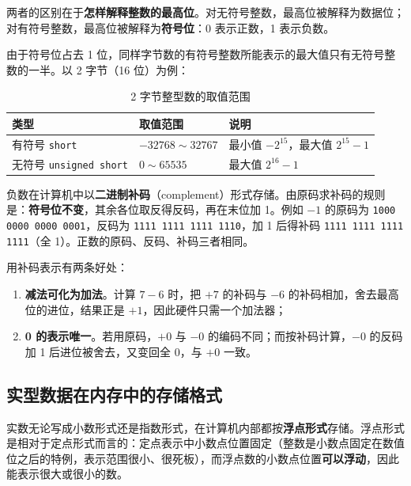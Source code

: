两者的区别在于\textbf{怎样解释整数的最高位}。对无符号整数，最高位被解释为数据位；对有符号整数，最高位被解释为\textbf{符号位}：0 表示正数，1 表示负数。

由于符号位占去 1 位，同样字节数的有符号整数所能表示的最大值只有无符号整数的一半。以 2 字节（16 位）为例：

\begin{table}[htbp]
\centering
\caption{2 字节整型数的取值范围}
\small
\begin{tabularx}{\textwidth}{@{}lXX@{}}
\toprule
类型 & 取值范围 & 说明 \\
\midrule
有符号 \texttt{short} & $-32768 \sim 32767$ & 最小值 $-2^{15}$，最大值 $2^{15}-1$ \\
无符号 \texttt{unsigned short} & $0 \sim 65535$ & 最大值 $2^{16}-1$ \\
\bottomrule
\end{tabularx}
\end{table}

负数在计算机中以\textbf{二进制补码}（complement）形式存储。由原码求补码的规则是：\textbf{符号位不变}，其余各位取反得反码，再在末位加 1。例如 $-1$ 的原码为 \texttt{1000 0000 0000 0001}，反码为 \texttt{1111 1111 1111 1110}，加 1 后得补码 \texttt{1111 1111 1111 1111}（全 1）。正数的原码、反码、补码三者相同。

用补码表示有两条好处：

\begin{enumerate}
  \item \textbf{减法可化为加法}。计算 $7-6$ 时，把 $+7$ 的补码与 $-6$ 的补码相加，舍去最高位的进位，结果正是 $+1$，因此硬件只需一个加法器；
  \item \textbf{0 的表示唯一}。若用原码，$+0$ 与 $-0$ 的编码不同；而按补码计算，$-0$ 的反码加 1 后进位被舍去，又变回全 0，与 $+0$ 一致。
\end{enumerate}


\subsection{实型数据在内存中的存储格式}

实数无论写成小数形式还是指数形式，在计算机内部都按\textbf{浮点形式}存储。浮点形式是相对于定点形式而言的：定点表示中小数点位置固定（整数是小数点固定在数值位之后的特例，表示范围很小、很死板），而浮点数的小数点位置\textbf{可以浮动}，因此能表示很大或很小的数。

